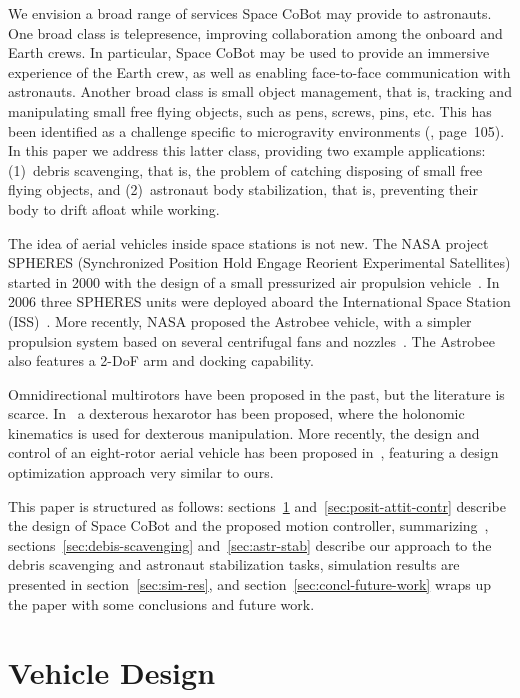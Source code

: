 \documentclass{article}
\begin{document}
We envision a broad range of services Space CoBot may provide to
astronauts.
One broad class is telepresence, improving
collaboration among the onboard and Earth crews. In particular, Space
CoBot may be used to provide an immersive experience of the Earth
crew, as well as enabling face-to-face communication with astronauts.
Another broad class is small object management, that
is, tracking and manipulating small free flying objects, such as pens,
screws, pins, etc. This has been identified as a challenge specific to
microgravity environments (\cite{stuster86}, page~105). In this paper
we address this latter class, providing two example applications:
(1)~debris scavenging, that is, the problem of catching disposing of small free
flying objects, and (2)~astronaut body stabilization, that is,
preventing their body to drift afloat while working.

The idea of aerial vehicles inside space stations is not new. The NASA
project SPHERES (Synchronized Position Hold Engage Reorient
Experimental Satellites) started in 2000 with the design of a small
pressurized air propulsion vehicle~\cite{miller00}. In 2006 three
SPHERES units were deployed aboard the International Space Station
(ISS)~\cite{nolet07}. More recently, NASA proposed the Astrobee
vehicle, with a simpler propulsion system based on several centrifugal
fans and nozzles~\cite{bualat15}. The Astrobee also features a 2-DoF
arm and docking capability.

Omnidirectional multirotors have been proposed in the past, but the
literature is scarce. In~\cite{jiang13,voyles12} a dexterous
hexarotor has been proposed, where the holonomic kinematics is
used for dexterous manipulation. More recently, the design and control
of an eight-rotor aerial vehicle has been proposed
in~\cite{bescianini16}, featuring a design optimization approach very
similar to ours.

This paper is structured as follows: sections~\ref{sec:vehicle-design}
and~\ref{sec:posit-attit-contr} describe the design of Space CoBot and
the proposed motion controller, summarizing~\cite{yoda:arxiv16a},
sections~\ref{sec:debis-scavenging} and~\ref{sec:astr-stab} describe
our approach to the debris scavenging and astronaut stabilization
tasks, simulation results are presented in
section~\ref{sec:sim-res}, and section~\ref{sec:concl-future-work}
wraps up the paper with some conclusions and future work.


\section{Vehicle Design}
\label{sec:vehicle-design}
\end{document}
